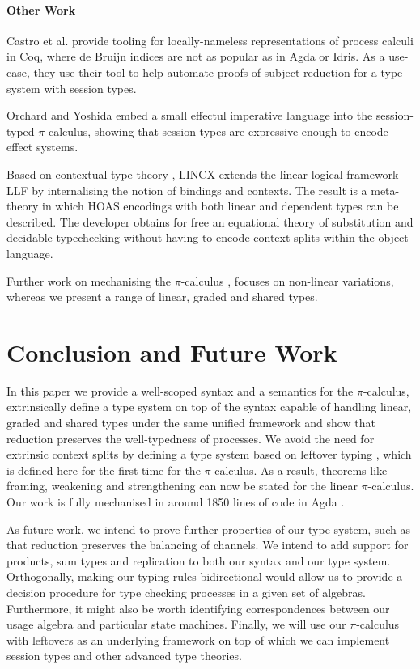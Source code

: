 \documentclass[]{llncs}
\newcommand{\picalc}{$\pi$-calculus}
\begin{document}
\paragraph*{Other Work}

Castro et al. \cite{Castro2020} provide tooling for locally-nameless representations of process calculi in Coq, where de Bruijn indices are not as popular as in Agda or Idris.
As a use-case, they use their tool to help automate proofs of subject reduction for a type system with session types.

Orchard and Yoshida \cite{OrchardY16} embed a small effectul imperative language into the session-typed \picalc{}, showing that session types are expressive enough to encode effect systems.

Based on contextual type theory \cite{Pientkaa,Pientka}, LINCX \cite{Georges2017} extends the linear logical framework LLF \cite{Cervesato1996} by internalising the notion of bindings and contexts.
The result is a meta-theory in which HOAS encodings with both linear and dependent types can be described.
The developer obtains for free an equational theory of substitution and decidable typechecking without having to encode context splits within the object language.

Further work on mechanising the \picalc{} \cite{Henry-Gerard1999,Honsell2001a,Bengtson2013,Despeyroux2000,Affeldt2008}, focuses on non-linear variations, whereas we present a range of linear, graded and shared types.

\section{Conclusion and Future Work}

In this paper we provide a well-scoped syntax and a semantics for the \picalc{}, extrinsically define a type system on top of the syntax capable of handling linear, graded and shared types under the same unified framework and show that reduction preserves the well-typedness of processes.
We avoid the need for extrinsic context splits by defining a type system based on leftover typing \cite{Allais2018a}, which is defined here for the first time for the \picalc{}.
As a result, theorems like framing, weakening and strengthening can now be stated for the linear \picalc{}.
Our work is fully mechanised in around 1850 lines of code in Agda \cite{Zalakain2020Agda}.

As future work, we intend to prove further properties of our type system, such as that reduction preserves the balancing of channels.
We intend to add support for products, sum types and replication to both our syntax and our type system.
Orthogonally, making our typing rules bidirectional would allow us to provide a decision procedure for type checking processes in a given set of algebras.
Furthermore, it might also be worth identifying correspondences between our usage algebra and particular state machines.
Finally, we will use our \picalc{} with leftovers as an underlying framework on top of which we can implement session types and other advanced type theories.
\end{document}
